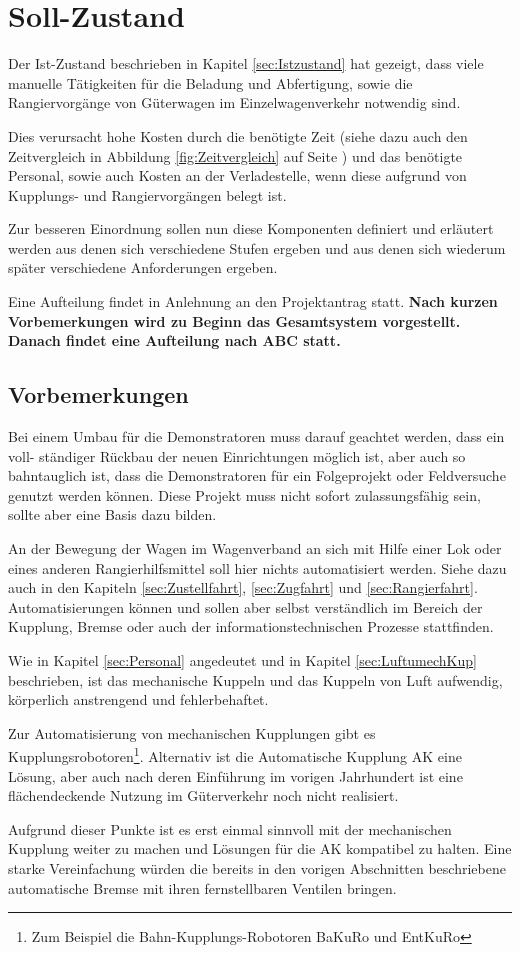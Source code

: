 \section{Soll-Zustand}
Der Ist-Zustand beschrieben in Kapitel \ref{sec:Istzustand} hat gezeigt, dass viele manuelle Tätigkeiten für die Beladung und Abfertigung, sowie die Rangiervorgänge von Güterwagen im Einzelwagenverkehr notwendig sind.\par
Dies verursacht hohe Kosten durch die benötigte Zeit (siehe dazu auch den Zeitvergleich in Abbildung \ref{fig:Zeitvergleich} auf Seite \pageref{fig:Zeitvergleich}) und das benötigte Personal, sowie auch Kosten an der Verladestelle, wenn diese aufgrund von Kupplungs- und Rangiervorgängen belegt ist.\par
Zur besseren Einordnung sollen nun diese Komponenten definiert und erläutert werden aus denen sich verschiedene Stufen ergeben und aus denen sich wiederum später verschiedene Anforderungen ergeben.\par
Eine Aufteilung findet in Anlehnung an den Projektantrag statt. \textbf{Nach kurzen Vorbemerkungen wird zu Beginn das Gesamtsystem vorgestellt. Danach findet eine Aufteilung nach ABC statt.}
\subsection{Vorbemerkungen}
Bei einem Umbau für die Demonstratoren muss darauf geachtet werden, dass ein voll- ständiger Rückbau der neuen Einrichtungen möglich ist, aber auch so bahntauglich ist, dass die Demonstratoren für ein Folgeprojekt oder Feldversuche genutzt werden können. Diese Projekt muss nicht sofort zulassungsfähig sein, sollte aber eine Basis dazu bilden. \par
An der Bewegung der Wagen im Wagenverband an sich mit Hilfe einer Lok oder eines anderen Rangierhilfsmittel soll hier nichts automatisiert werden. Siehe dazu auch in den Kapiteln \ref{sec:Zustellfahrt}, \ref{sec:Zugfahrt} und \ref{sec:Rangierfahrt}. Automatisierungen können und sollen aber selbst verständlich im Bereich der Kupplung, Bremse oder auch der informationstechnischen Prozesse stattfinden.\par
Wie in Kapitel \ref{sec:Personal} angedeutet und in Kapitel \ref{sec:LuftumechKup} beschrieben, ist das mechanische Kuppeln und das Kuppeln von Luft aufwendig, körperlich anstrengend und fehlerbehaftet. \par
Zur Automatisierung von mechanischen Kupplungen gibt es Kupplungsrobotoren\footnote{Zum Beispiel die Bahn-Kupplungs-Robotoren BaKuRo und EntKuRo}. Alternativ ist die Automatische Kupplung \acrshort{AK} eine Lösung, aber auch nach deren Einführung im vorigen Jahrhundert ist eine flächendeckende Nutzung im Güterverkehr noch nicht realisiert.\par
Aufgrund dieser Punkte ist es erst einmal sinnvoll mit der mechanischen Kupplung weiter zu machen und Lösungen für die \acrshort{AK} kompatibel zu halten. Eine starke Vereinfachung würden die bereits in den vorigen Abschnitten beschriebene automatische Bremse mit ihren fernstellbaren Ventilen bringen.

